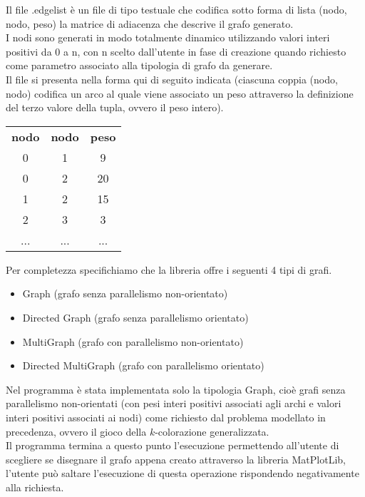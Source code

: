 Il file .edgelist è un file di tipo testuale che codifica sotto forma di lista (nodo, nodo, peso) la matrice di adiacenza che descrive il grafo generato.\\

I nodi sono generati in modo totalmente dinamico utilizzando valori interi positivi da 0 a n, con n scelto dall'utente in fase di creazione quando richiesto come parametro associato alla tipologia di grafo da generare.\\

Il file si presenta nella forma qui di seguito indicata (ciascuna coppia (nodo, nodo) codifica un arco al quale viene associato un peso attraverso la definizione del terzo valore della tupla, ovvero il peso intero).\\

\begin{table}[H]
\centering
\begin{tabular}{ccc}
\textbf{nodo} & \textbf{nodo} & \textbf{peso} \\
0 & 1 & 9 \\
0 & 2 & 20 \\
1 & 2 & 15 \\
2 & 3 & 3 \\
... & ... & ...
\end{tabular}
\end{table}

Per completezza specifichiamo che la libreria offre i seguenti 4 tipi di grafi.

\begin{itemize}
	\item Graph (grafo senza parallelismo non-orientato)
	\item Directed Graph (grafo senza parallelismo orientato)
	\item MultiGraph (grafo con parallelismo non-orientato)
	\item Directed MultiGraph (grafo con parallelismo orientato)
\end{itemize}

Nel programma è stata implementata solo la tipologia Graph, cioè grafi senza parallelismo non-orientati (con pesi interi positivi associati agli archi e valori interi positivi associati ai nodi) come richiesto dal problema modellato in precedenza, ovvero il gioco della \(k\)-colorazione generalizzata.\\

Il programma termina a questo punto l'esecuzione permettendo all'utente di scegliere se disegnare il grafo appena creato attraverso la libreria MatPlotLib, l'utente può saltare l'esecuzione di questa operazione rispondendo negativamente alla richiesta.\\

